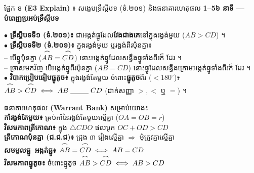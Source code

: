 \documentclass[a4paper,10pt]{article}
\newcommand{\en}[1]{{\TimesEn #1}}
\newcommand{\enbf}[1]{{\TimesEn\bfseries #1}}
\newcommand{\cnum}[1]{\mbox{\fontsize{10pt}{12pt}\selectfont\ding{\numexpr181+#1\relax}}}
\newcommand{\tri}[1]{\ensuremath{\triangle #1}}
\newcommand{\arc}[1]{\ensuremath{\overset{\tikz[baseline=-0.55ex]\draw[black, line width=0.55pt] (0,0) to[bend left=40] (1.8ex,0);}{#1}}}
\newcommand{\blank}[1]{\underline{\hspace{#1}}}
\newcommand{\secbox}[2]{%
  \begin{tcolorbox}[
    enhanced, sharp corners, colback=headgray, colframe=black,
    boxrule=0.95pt, boxsep=1pt, top=2.0pt, bottom=2.0pt, left=6pt, right=6pt,
    before skip=3pt, after skip=2pt
  ]
    {\muol\fontsize{9.2pt}{13.2pt}\selectfont #1}\hfill{\fontsize{8.2pt}{11.5pt}\selectfont\textbf{#2}}
  \end{tcolorbox}%
}
\begin{document}
\secbox{ផ្នែក ខ \enbf{(E3 Explain)} ៖ សង្ខេបទ្រឹស្ដីបទ (ទំ.២០១) និងធនាគារហេតុផល \enbf{1--5}}{៦ នាទី \en{---} បំពេញប្រអប់ទ្រឹស្ដីបទ}

\begin{minipage}[t]{10.2cm}
  \vspace{2pt}
  $\bullet$ \textbf{ទ្រឹស្ដីបទទី១ (ទំ.២០១)៖} \blank{2.8cm} ជាអង្កត់ធ្នូដែល\textbf{វែងជាងគេ}នៅក្នុងរង្វង់មួយ ($AB > CD$) ។\\[4pt]
  $\bullet$ \textbf{ទ្រឹស្ដីបទទី២ (ទំ.២០១)៖} ក្នុងរង្វង់មួយ ឬរង្វង់ពីរប៉ុនគ្នា៖\\
  \hspace*{0.3cm}-- បើធ្នូប៉ុនគ្នា ($\arc{AB}=\arc{CD}$) នោះអង្កត់ធ្នូដែលសន្ធឹងធ្នូទាំងពីរក៏ \blank{2.3cm} ដែរ ។\\
  \hspace*{0.3cm}-- ច្រាសមកវិញ បើអង្កត់ធ្នូពីរប៉ុនគ្នា ($AB=CD$) នោះធ្នូដែលសន្ធឹងក្រោមអង្កត់ធ្នូទាំងពីរក៏ \blank{2.3cm} ដែរ ។\\[4pt]
  $\bullet$ \textbf{វិបាកប្រៀបធៀបធ្នូតូច៖} ក្នុងរង្វង់តែមួយ ចំពោះ\textbf{ធ្នូតូច}ពីរ ($<180^\circ$)៖\\
  \hspace*{0.3cm}$\arc{AB} > \arc{CD} \iff AB \;\blank{0.9cm}\; CD$ (ដាក់សញ្ញា $> , <$ ឬ $=$) ។
\end{minipage}\hfill%
\begin{minipage}[t]{8.4cm}
  \vspace{0pt}
  \begin{tcolorbox}[
    enhanced, sharp corners, colback=panelgray, colframe=black,
    boxrule=0.85pt, boxsep=1.5pt, top=3pt, bottom=3pt, left=5pt, right=5pt
  ]
    {\muol\fontsize{8.8pt}{12.5pt}\selectfont ធនាគារហេតុផល \enbf{(Warrant Bank)} សម្រាប់យោង៖}\\[3pt]
    {\fontsize{8.5pt}{12.8pt}\selectfont
    \cnum{1} \textbf{កាំរង្វង់តែមួយ៖} គ្រប់កាំនៃរង្វង់តែមួយស្មើគ្នា ($OA=OB=r$)\\
    \cnum{2} \textbf{វិសមភាពត្រីកោណ៖} ក្នុង $\tri{CDO}$ ផលបូក $OC+OD > CD$\\
    \cnum{3} \textbf{ត្រីកោណប៉ុនគ្នា (ជ.ជ.ជ)៖} ជ្រុង ៣ រៀងស្មើគ្នា $\Rightarrow$ មុំត្រូវគ្នាស្មើគ្នា\\
    \cnum{4} \textbf{សមមូលធ្នូ--អង្កត់ធ្នូ៖} $\arc{AB}=\arc{CD} \iff AB=CD$\\
    \cnum{5} \textbf{វិសមភាពធ្នូតូច៖} ចំពោះធ្នូតូច $\arc{AB}>\arc{CD} \iff AB>CD$}
  \end{tcolorbox}
\end{minipage}
\end{document}
